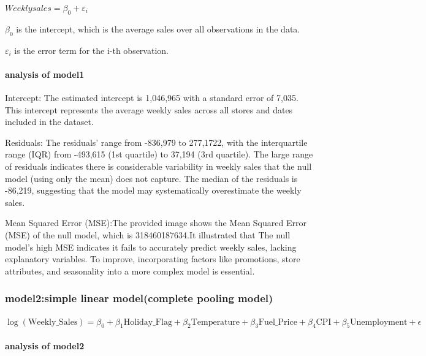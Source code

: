 \documentclass[
  letterpaper,
  DIV=11,
  numbers=noendperiod]{scrartcl}
\let\oldparagraph\paragraph
\renewcommand{\paragraph}[1]{\oldparagraph{#1}\mbox{}}
\begin{document}
\(Weeklysales = \beta_0 + \varepsilon_i\)

\(\beta_0\) is the intercept, which is the average sales over all
observations in the data.

\(\varepsilon_i\) is the error term for the i-th observation.

\hypertarget{analysis-of-model1}{%
\paragraph{analysis of model1}\label{analysis-of-model1}}

Intercept: The estimated intercept is 1,046,965 with a standard error of
7,035. This intercept represents the average weekly sales across all
stores and dates included in the dataset.

Residuals: The residuals' range from -836,979 to 277,1722, with the
interquartile range (IQR) from -493,615 (1st quartile) to 37,194 (3rd
quartile). The large range of residuals indicates there is considerable
variability in weekly sales that the null model (using only the mean)
does not capture. The median of the residuals is -86,219, suggesting
that the model may systematically overestimate the weekly sales.

Mean Squared Error (MSE):The provided image shows the Mean Squared Error
(MSE) of the null model, which is 318460187634.It illustrated that The
null model's high MSE indicates it fails to accurately predict weekly
sales, lacking explanatory variables. To improve, incorporating factors
like promotions, store attributes, and seasonality into a more complex
model is essential.

\hypertarget{model2simple-linear-modelcomplete-pooling-model}{%
\subsubsection{model2:simple linear model(complete pooling
model)}\label{model2simple-linear-modelcomplete-pooling-model}}

\(\log(\text{Weekly_Sales}) = \beta_0 + \beta_1 \text{Holiday_Flag} + \beta_2 \text{Temperature} + \beta_3 \text{Fuel_Price} + \beta_4 \text{CPI} + \beta_5 \text{Unemployment} + \epsilon\)

\hypertarget{analysis-of-model2}{%
\paragraph{analysis of model2}\label{analysis-of-model2}}
\end{document}
